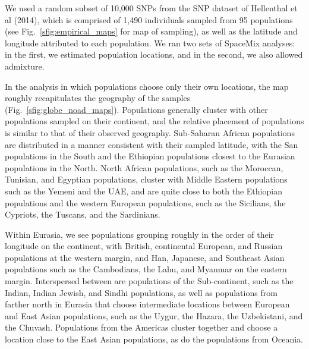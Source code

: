 \documentclass[12pt]{article}
\begin{document}


We used a random subset of 10,000 SNPs from the SNP dataset of Hellenthal et al (2014), which is comprised of 1,490 individuals sampled from 95 populations (see Fig.\ \ref{sfig:empirical_maps} for map of sampling), as well as the latitude and longitude attributed to each population.  We ran two sets of SpaceMix analyses: in the first, we estimated population locations, and in the second, we also allowed admixture.

In the analysis in which populations choose only their own locations, the map roughly recapitulates the geography of the samples (Fig.\ \ref{sfig:globe_noad_maps}).  Populations generally cluster with other populations sampled on their continent, and the relative placement of populations is similar to that of their observed geography.  Sub-Saharan African populations are distributed in a manner consistent with their sampled latitude, with the San populations in the South and the Ethiopian populations closest to the Eurasian populations in the North.  North African populations, such as the Moroccan, Tunisian, and Egyptian populations, cluster with Middle Eastern populations such as the Yemeni and the UAE, and are quite close to both the Ethiopian populations and the western European populations, such as the Sicilians, the Cypriots, the Tuscans, and the Sardinians.

Within Eurasia, we see populations grouping roughly in the order of their longitude on the continent, with British, continental European, and Russian populations at the western margin, and Han, Japanese, and Southeast Asian populations such as the Cambodians, the Lahu, and Myanmar on the eastern margin.  Interspersed between are populations of the Sub-continent, such as the Indian, Indian Jewish, and Sindhi populations, as well as populations from farther north in Eurasia that choose intermediate locations between European and East Asian populations, such as the Uygur, the Hazara, the Uzbekistani, and the Chuvash.  Populations from the Americas cluster together and choose a location close to the East Asian populations, as do the populations from Oceania.
\end{document}
